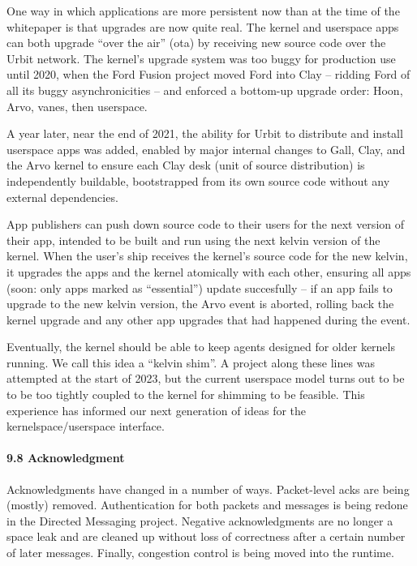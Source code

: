 \documentclass[twoside]{article}
\begin{document}
One way in which applications are more persistent now than at the time of the whitepaper is that upgrades are now quite real.  The kernel and userspace apps can both upgrade ``over the air'' ({\sc ota}) by receiving new source code over the Urbit network.  The kernel's upgrade system was too buggy for production use until 2020, when the Ford Fusion project moved Ford into Clay – ridding Ford of all its buggy asynchronicities – and enforced a bottom-up upgrade order: Hoon, Arvo, vanes, then userspace.

A year later, near the end of 2021, the ability for Urbit to distribute and install userspace apps was added, enabled by major internal changes to Gall, Clay, and the Arvo kernel to ensure each Clay desk (unit of source distribution) is independently buildable, bootstrapped from its own source code without any external dependencies.

App publishers can push down source code to their users for the next version of their app, intended to be built and run using the next kelvin version of the kernel.  When the user's ship receives the kernel's source code for the new kelvin, it upgrades the apps and the kernel atomically with each other, ensuring all apps (soon: only apps marked as ``essential'') update succesfully – if an app fails to upgrade to the new kelvin version, the Arvo event is aborted, rolling back the kernel upgrade and any other app upgrades that had happened during the event.

Eventually, the kernel should be able to keep agents designed for older kernels running.  We call this idea a ``kelvin shim''.  A project along these lines was attempted at the start of 2023, but the current userspace model turns out to be to be too tightly coupled to the kernel for shimming to be feasible.  This experience has informed our next generation of ideas for the kernelspace/userspace interface.

\paragraph{9.8 Acknowledgment}  Acknowledgments have changed in a number of ways.  Packet-level acks are being (mostly) removed.  Authentication for both packets and messages is being redone in the Directed Messaging project.  Negative acknowledgments are no longer a space leak and are cleaned up without loss of correctness after a certain number of later messages.  Finally, congestion control is being moved into the runtime.
\end{document}
